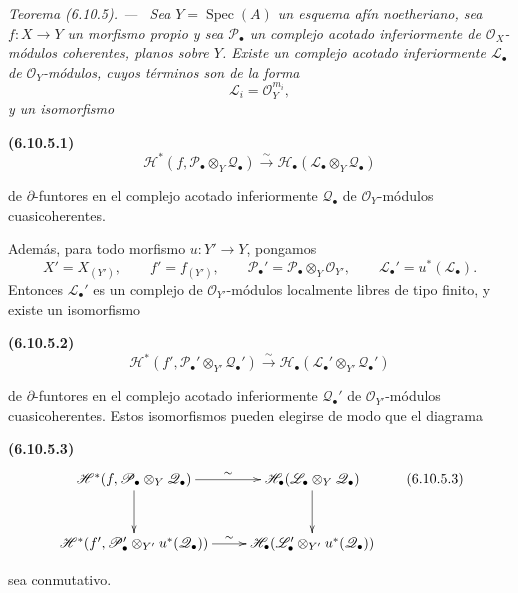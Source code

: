 \documentclass[10pt,oneside]{book}
\newcommand{\sh}[1]{\mathscr{#1}}
\newcommand{\Spec}{\operatorname{Spec}}
\newcommand{\oldpage}[2][]{\setcounter{footnote}{0}\marginpar{\scriptsize\textbf{#1}~|~#2}\ignorespaces}
\newenvironment{env}[1][]{\par\medskip\noindent\textbf{(#1)}\ }{\par}
\newenvironment{theorem}[1][]{\par\medskip\noindent\itshape Teorema (#1). ---\ }{\par}
\begin{document}
\begin{theorem}[6.10.5]
\label{III.6.10.5}
Sea $Y=\Spec(A)$ un esquema afín noetheriano, sea
$f:X\to Y$ un morfismo propio y sea $\sh P_\bullet$ un complejo
acotado inferiormente de $\sh O_X$-módulos coherentes, \textup{planos}
sobre $Y$. Existe un complejo acotado inferiormente
$\sh L_\bullet$ de $\sh O_Y$-módulos, cuyos términos son de la
forma
\[
  \sh L_i=\sh O_Y^{m_i},
\]
y un isomorfismo
\begin{env}[6.10.5.1]
\label{III.6.10.5.1}
\[
  \sh H^*
  (f,\sh P_\bullet\otimes_Y\sh Q_\bullet)
  \xrightarrow{\sim}
  \sh H_\bullet
  (\sh L_\bullet\otimes_Y\sh Q_\bullet)
  \tag{6.10.5.1}\label{III.6.10.5.1.eq}
\]
\end{env}
de $\partial$-funtores en el complejo acotado inferiormente
$\sh Q_\bullet$ de $\sh O_Y$-módulos cuasicoherentes.

Además, para todo morfismo $u:Y'\to Y$, pongamos
\[
  X'=X_{(Y')},
  \qquad
  f'=f_{(Y')},
  \qquad
  \sh P_\bullet'
  =
  \sh P_\bullet\otimes_Y\sh O_{Y'},
  \qquad
  \sh L_\bullet'=u^*(\sh L_\bullet).
\]
\oldpage[III]{174}
Entonces $\sh L_\bullet'$ es un complejo de
$\sh O_{Y'}$-módulos localmente libres de tipo finito, y existe
un isomorfismo
\begin{env}[6.10.5.2]
\label{III.6.10.5.2}
\[
  \sh H^*
  (f',\sh P_\bullet'\otimes_{Y'}\sh Q_\bullet')
  \xrightarrow{\sim}
  \sh H_\bullet
  (\sh L_\bullet'\otimes_{Y'}\sh Q_\bullet')
  \tag{6.10.5.2}\label{III.6.10.5.2.eq}
\]
\end{env}
de $\partial$-funtores en el complejo acotado inferiormente
$\sh Q_\bullet'$ de $\sh O_{Y'}$-módulos cuasicoherentes. Estos
isomorfismos pueden elegirse de modo que el diagrama
\begin{env}[6.10.5.3]
\label{III.6.10.5.3}
\[
\xymatrix@C=24pt@R=30pt{
  \sh H^*
  (f,\sh P_\bullet\otimes_Y\sh Q_\bullet)
  \ar[r]^-{\sim}\ar[d]
  &
  \sh H_\bullet
  (\sh L_\bullet\otimes_Y\sh Q_\bullet)
  \ar[d]
  \\
  \sh H^*
  (f',\sh P_\bullet'\otimes_{Y'}u^*(\sh Q_\bullet))
  \ar[r]^-{\sim}
  &
  \sh H_\bullet
  (\sh L_\bullet'\otimes_{Y'}u^*(\sh Q_\bullet))
}
\tag{6.10.5.3}\label{III.6.10.5.3.eq}
\]
\end{env}
sea conmutativo.
\end{theorem}
\end{document}
